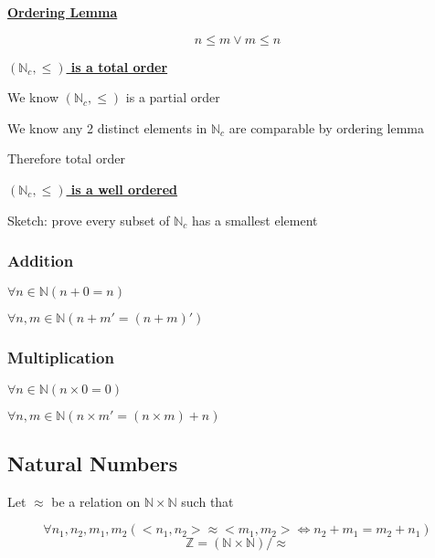 \documentclass[12pt]{article}
\begin{document}
\begin{spacing}{1.5}
\underline{\textbf{Ordering Lemma}}

$$n \le m \vee m \le n$$

\underline{\textbf{$(\mathbb{N}_c, \le)$ is a total order}}

\begin{enumerate*}
	\item We know $(\mathbb{N}_c, \le)$ is a partial order
	\item We know any 2 distinct elements in $\mathbb{N}_c$ are comparable by ordering lemma
	\item Therefore total order
\end{enumerate*}

\underline{\textbf{$(\mathbb{N}_c, \le)$ is a well ordered}}

\begin{enumerate*}
	\item Sketch: prove every subset of $\mathbb{N}_c$ has a smallest element
\end{enumerate*}

\subsubsection{Addition}

\begin{itemize*}
	\item $\forall n \in \mathbb{N} (n+0=n)$
	\item $\forall n, m \in \mathbb{N} (n+m' = (n+m)')$
\end{itemize*}

\subsubsection{Multiplication}

\begin{itemize*}
	\item $\forall n \in \mathbb{N} (n \times 0 = 0)$
	\item $\forall n, m \in \mathbb{N} (n \times m' = (n \times m) + n)$
\end{itemize*}

\subsection{Natural Numbers}

Let $\approx$ be a relation on $\mathbb{N} \times \mathbb{N}$ such that

$$\forall n_1, n_2, m_1, m_2 (<n_1, n_2> \approx <m_1, m_2> \Leftrightarrow n_2 + m_1 = m_2 + n_1)$$
$$\mathbb{Z} = (\mathbb{N} \times \mathbb{N})/\approx$$


\end{spacing}
\end{document}
